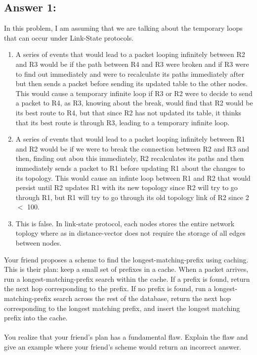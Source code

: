 \documentclass[10pt]{article}
\newenvironment{problem}[2][]{\begin{trivlist}
\item[\hskip \labelsep {\bfseries #1}\hskip \labelsep {\bfseries #2.}]}{\end{trivlist}}
\begin{document}
\subsection*{Answer 1:}
In this problem, I am assuming that we are talking about the temporary loops that can occur under Link-State protocols.
\begin{enumerate}
  \item A series of events that would lead to a packet looping infinitely between R2 and R3 would be if the path between R4 and R3 were broken and if R3 were to find out immediately and were to recalculate its paths immediately after but then sends a packet before sending its updated table to the other nodes. This would cause a temporary infinite loop if R3 or R2 were to decide to send a packet to R4, as R3, knowing about the break, would find that R2 would be its best route to R4, but that since R2 has not updated its table, it thinks that its best route is through R3, leading to a temporary infinite loop.
  \item A series of events that would lead to a packet looping infinitely between R1 and R2 would be if we were to break the connection between R2 and R3 and then, finding out abou this immediately, R2 recalculates its paths and then immediately sends a packet to R1 before updating R1 about the changes to its topology. This would cause an infinte loop between R1 and R2 that would persist until R2 updates R1 with its new topology since R2 will try to go through R1, but R1 will try to go through its old topology link of R2 since 2 $<$ 100.
  \item This is false. In link-state protocol, each nodes stores the entire network toplogy where as in distance-vector does not require the storage of all edges between nodes.
\end{enumerate}

\begin{problem}{2: Longest Matching Prefix Caching}
Your friend proposes a scheme to find the longest-matching-prefix using caching. This is their plan: keep a small set of prefixes in a cache. When a packet arrives, run a longest-matching-prefix search within the cache. If a prefix is found, return the next hop corresponding to the prefix. If no prefix is found, run a longest-matching-prefix search across the rest of the database, return the next hop corresponding to the longest matching prefix, and insert the longest matching prefix into the cache. \\\\
You realize that your friend's plan has a fundamental flaw. Explain the flaw and give an example where your friend's scheme would return an incorrect answer.
\end{problem}
\end{document}
